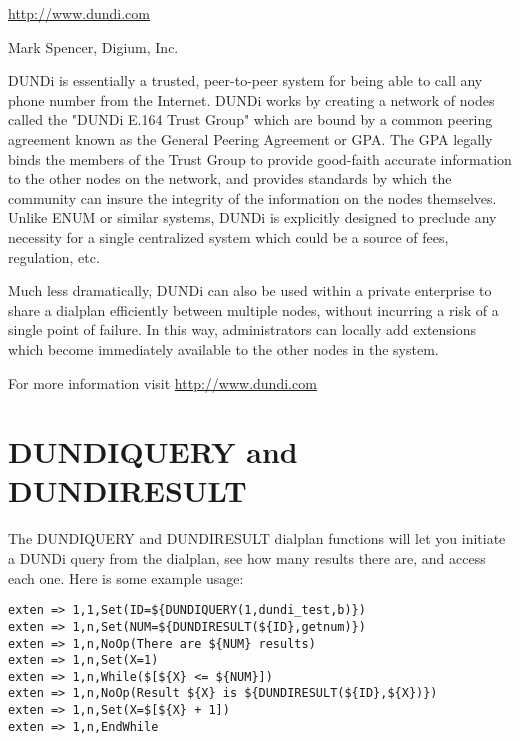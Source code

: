 \url{http://www.dundi.com}

Mark Spencer, Digium, Inc.

DUNDi is essentially a trusted, peer-to-peer system for being able to
call any phone number from the Internet.  DUNDi works by creating a
network of nodes called the "DUNDi E.164 Trust Group" which are bound by
a common peering agreement known as the General Peering Agreement or
GPA.  The GPA legally binds the members of the Trust Group to provide
good-faith accurate information to the other nodes on the network, and
provides standards by which the community can insure the integrity of
the information on the nodes themselves.  Unlike ENUM or similar
systems, DUNDi is explicitly designed to preclude any necessity for a
single centralized system which could be a source of fees, regulation,
etc.

Much less dramatically, DUNDi can also be used within a private
enterprise to share a dialplan efficiently between multiple nodes,
without incurring a risk of a single point of failure.  In this way,
administrators can locally add extensions which become immediately
available to the other nodes in the system.

For more information visit \url{http://www.dundi.com}

\section{DUNDIQUERY and DUNDIRESULT}

The DUNDIQUERY and DUNDIRESULT dialplan functions will let you initiate
a DUNDi query from the dialplan, see how many results there are, and access
each one.  Here is some example usage:

\begin{verbatim}
exten => 1,1,Set(ID=${DUNDIQUERY(1,dundi_test,b)})
exten => 1,n,Set(NUM=${DUNDIRESULT(${ID},getnum)})
exten => 1,n,NoOp(There are ${NUM} results)
exten => 1,n,Set(X=1) 
exten => 1,n,While($[${X} <= ${NUM}])
exten => 1,n,NoOp(Result ${X} is ${DUNDIRESULT(${ID},${X})}) 
exten => 1,n,Set(X=$[${X} + 1])
exten => 1,n,EndWhile
\end{verbatim}

